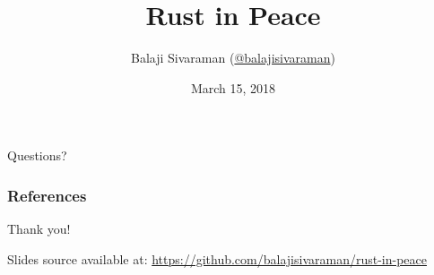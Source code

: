 \documentclass[bigger]{beamer}
\author{Balaji Sivaraman (\href{https://twitter.com/balajisivaraman}{@balajisivaraman})}
\date{March 15, 2018}
\title{Rust in Peace}
\institute{ThoughtWorks}
\begin{document}
\maketitle









\begin{frame}
  \centerline{
    \huge{Questions?}
  }
\end{frame}

\begin{frame}
  \frametitle{References}
  \renewcommand*{\bibfont}{\scriptsize}
  \printbibliography
\end{frame}

\begin{frame}
  \centerline{
    \huge{Thank you!}
  }
  \centerline{
    \footnotesize{Slides source available at: \href{https://github.com/balajisivaraman/rust-in-peace}{https://github.com/balajisivaraman/rust-in-peace}}
  }
\end{frame}
\end{document}
